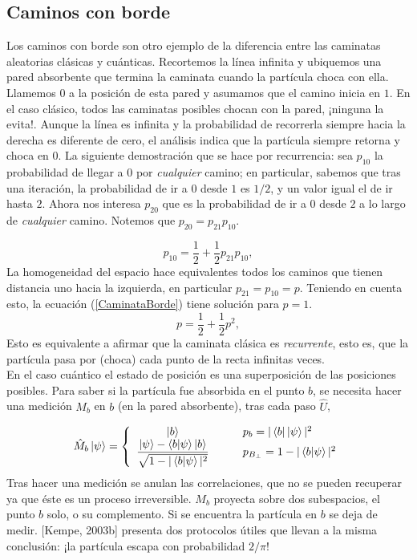 \subsection{Caminos con borde}
Los caminos con borde son otro ejemplo de la diferencia entre las caminatas aleatorias clásicas y cuánticas. Recortemos la línea infinita y ubiquemos una pared absorbente que termina la caminata cuando la partícula choca con ella. Llamemos $0$ a la posición de esta pared y asumamos que el camino inicia en $1$. En el caso clásico, todos las caminatas posibles chocan con la pared, ¡ninguna la evita!. Aunque la línea es infinita y la probabilidad de recorrerla siempre hacia la derecha es diferente de cero, el análisis indica que la partícula siempre retorna y choca en $0$. La siguiente demostración que se hace por recurrencia: sea $p_{10}$ la probabilidad de llegar a $0$ por \textit{cualquier} camino; en particular, sabemos que tras una iteración, la probabilidad de ir a $0$ desde $1$ es $1/2$, y un valor igual el de ir hasta $2$. Ahora nos interesa $p_{20}$ que es la probabilidad de ir a $0$ desde $2$ a lo largo de \textit{cualquier} camino. Notemos que $p_{20}=p_{21}p_{10}$.

\begin{equation}
p_{10}=\frac{1}{2}+\frac{1}{2}p_{21}p_{10} ,
\label{CaminataBorde}
\end{equation}{}
La homogeneidad del espacio hace equivalentes todos los caminos que tienen distancia uno hacia la izquierda, en particular $p_{21}=p_{10}=p$. Teniendo en cuenta esto, la ecuación (\ref{CaminataBorde}) tiene solución para $p=1$. 
\begin{equation}
p=\frac{1}{2}+\frac{1}{2}p^2 ,
\end{equation}
Esto es equivalente a afirmar que la caminata clásica es \textit{recurrente}, esto es, que la partícula pasa por (choca) cada punto de la recta infinitas veces.\\
En el caso cuántico el estado de posición es una superposición de las posiciones posibles. Para saber si la partícula fue absorbida en el punto $b$, se necesita hacer una medición $M_b$ en $b$ (en la pared absorbente), tras cada paso $\hat{U}$,

\begin{equation*}
    \hat{M}_b\ket{\psi}=
    \left\{
    \begin{array}{cl}
        \ket{b} & \qquad p_b=|\bra{b}\ket{\psi}|^2 \\
        \dfrac{\ket{\psi}-\braket{b|\psi}\ket{b}}{\sqrt{1-|\braket{b|\psi}|^2}} &\qquad p_{B_\perp}=1-|\braket{b|\psi}|^2 
    \end{array}
    \right.
\end{equation*}{}
Tras hacer una medición se anulan las correlaciones, que no se pueden recuperar ya que éste es un proceso irreversible. $M_b$ proyecta sobre dos subespacios, el punto $b$ solo, o su complemento. Si se encuentra la partícula en $b$ se deja de medir. [Kempe, 2003b] presenta dos protocolos útiles que llevan a la misma conclusión: ¡la partícula escapa con probabilidad $2/\pi$!